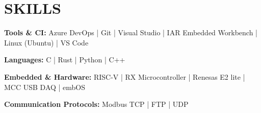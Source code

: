 \section{SKILLS}

\textbf{Tools \& CI:} Azure DevOps | Git | Visual Studio | IAR Embedded Workbench | Linux (Ubuntu) | VS Code \par
\textbf{Languages:} C | Rust | Python | C++ \par
\textbf{Embedded \& Hardware:} RISC-V | RX Microcontroller | Renesas E2 lite | MCC USB DAQ | embOS  \par
\textbf{Communication Protocols:} Modbus TCP | FTP | UDP